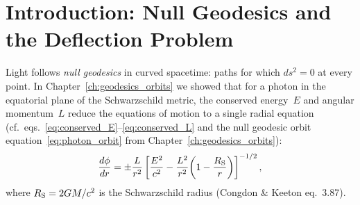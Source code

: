 \section{Introduction: Null Geodesics and the Deflection Problem}
\label{sec:deflection_intro}

Light follows \emph{null geodesics} in curved spacetime: paths for which
$ds^2 = 0$ at every point.  In Chapter~\ref{ch:geodesics_orbits} we showed that for a photon in
the equatorial plane of the Schwarzschild metric, the conserved energy~$E$
and angular momentum~$L$ reduce the equations of motion to a single radial
equation (cf.\ eqs.~\ref{eq:conserved_E}--\ref{eq:conserved_L} and the
null geodesic orbit equation~\eqref{eq:photon_orbit} from Chapter~\ref{ch:geodesics_orbits}):
\begin{equation}
    \frac{d\phi}{dr} = \pm \frac{L}{r^2}
    \left[\frac{E^2}{c^2}
    - \frac{L^2}{r^2}\!\left(1 - \frac{R_{\mathrm{S}}}{r}\right)
    \right]^{-1/2} ,
    \label{eq:photon_orbit_eq}
\end{equation}
where $R_{\mathrm{S}} = 2G M / c^2$ is the Schwarzschild radius
(Congdon \& Keeton eq.~3.87).


